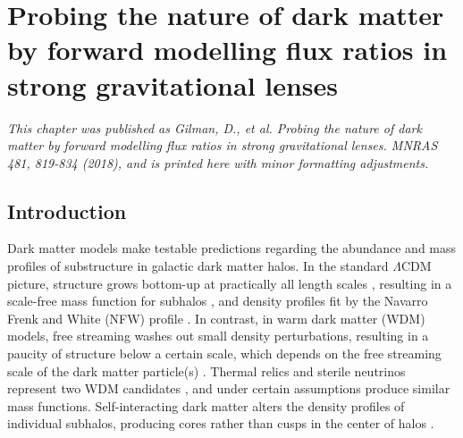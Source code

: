 \def\msub{{\bf{m}_{\rm{sub}}}}
\def\qsub{{\bf{q}_{\rm{sub}}}}
\def\qmac{{\bf{q}_{\rm{mac}}}}
\def\qmacn{{\bf{q}_{\rm{mac(n)}}}}
\def\data{{\bf{d}_{\rm{n}}}}
\def\Data{{\bf{D}}} 
\def\datamod{{\bf{d}_{\rm{n}}^{\ \prime}}}
\def\fobs{{\bf{f_n}}}
\def\fmod{{\bf{f}_{n}^{\ \prime}}}
\def\dlinmod{{\bf{d}_{tx(n)}^{\ \prime}}}
\def\dlin{{\bf{d}_{tx(n)}}}
\def\dlinmlm{{\bf{d}_{tx(n)}^{\ \star}}}
\def\qmacs{{\bf{q}_{\rm{mac(n)}}^{\ \star}}}
\def\fmods{{\bf{f_n}^{\star}}}
\def\msubn{{\bf{m}_{\rm{sub(n)}}}}
\def\qsubi{{\bf{q}_{\rm{sub(i)}}}}
\def\msun{{\rm{M}_{\odot}}}
\def\fobsi{{f_{n\left(i\right)}}}
\def\fmodsi{{f_{n\left(i\right)}^{\ \star}}}
\def\qmacss{{\bf{q}_{\rm{mac(n)}}^{\ \star \star}}}
\def\fmodss{{\bf{f_n}^{\star \star}}}

\chapter{Probing the nature of dark matter by forward modelling flux ratios in strong gravitational lenses}
\textit{This chapter was published as Gilman, D., et al. Probing the nature of dark matter by forward modelling flux ratios in strong gravitational lenses. MNRAS 481, 819-834 (2018), and is printed here with minor formatting adjustments.}

\section{Introduction}
Dark matter models make testable predictions regarding the abundance and mass profiles of substructure in galactic dark matter halos. In the standard $\Lambda$CDM picture, structure grows bottom-up at practically all length scales \cite{Schneider++13}, resulting in a scale-free mass function for subhalos \cite{Springel++08,Gao++11,Fiacconi++16}, and density profiles fit by the Navarro Frenk and White (NFW) profile \cite{Navarro++96}. In contrast, in warm dark matter (WDM) models, free streaming washes out small density perturbations, resulting in a paucity of structure below a certain scale, which depends on the free streaming scale of the dark matter particle(s) \cite{Schneider++12,Pullen++14,Viel13,Lovell++16,Bose++16,Menci++16}. Thermal relics and sterile neutrinos represent two WDM candidates \cite{Kusenko09,Abazajian17}, and under certain assumptions produce similar mass functions. Self-interacting dark matter alters the density profiles of individual subhalos, producing cores rather than cusps in the center of halos \cite{Schneider++16,Vogelsberger++16,Kamada++17}.

